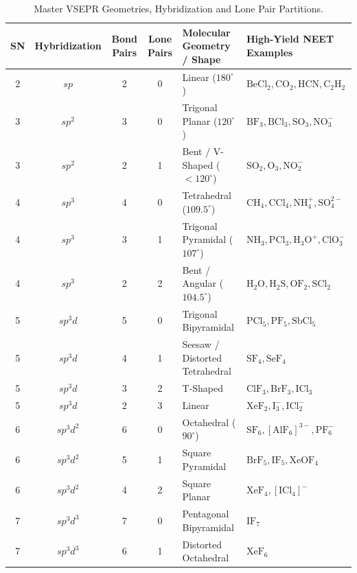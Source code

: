 \documentclass[11pt,a4paper]{article}
\begin{document}
\begin{table}[htbp]
\centering
\small
\renewcommand{\arraystretch}{1.2}
\begin{tabularx}{\textwidth}{c c c c L L}
\toprule
\textbf{SN} & \textbf{Hybridization} & \textbf{Bond Pairs} & \textbf{Lone Pairs} & \textbf{Molecular Geometry / Shape} & \textbf{High-Yield NEET Examples} \\
 & $sp$ & 2 & 0 & Linear ($180^\circ$) & $\text{BeCl}_2, \text{CO}_2, \text{HCN}, \text{C}_2\text{H}_2$ \\
3 & $sp^2$ & 3 & 0 & Trigonal Planar ($120^\circ$) & $\text{BF}_3, \text{BCl}_3, \text{SO}_3, \text{NO}_3^-$ \\
3 & $sp^2$ & 2 & 1 & Bent / V-Shaped ($< 120^\circ$) & $\text{SO}_2, \text{O}_3, \text{NO}_2^-$ \\
4 & $sp^3$ & 4 & 0 & Tetrahedral ($109.5^\circ$) & $\text{CH}_4, \text{CCl}_4, \text{NH}_4^+, \text{SO}_4^{2-}$ \\
4 & $sp^3$ & 3 & 1 & Trigonal Pyramidal ($107^\circ$) & $\text{NH}_3, \text{PCl}_3, \text{H}_3\text{O}^+, \text{ClO}_3^-$ \\
4 & $sp^3$ & 2 & 2 & Bent / Angular ($104.5^\circ$) & $\text{H}_2\text{O}, \text{H}_2\text{S}, \text{OF}_2, \text{SCl}_2$ \\
5 & $sp^3d$ & 5 & 0 & Trigonal Bipyramidal & $\text{PCl}_5, \text{PF}_5, \text{SbCl}_5$ \\
5 & $sp^3d$ & 4 & 1 & Seesaw / Distorted Tetrahedral & $\text{SF}_4, \text{SeF}_4$ \\
5 & $sp^3d$ & 3 & 2 & T-Shaped & $\text{ClF}_3, \text{BrF}_3, \text{ICl}_3$ \\
5 & $sp^3d$ & 2 & 3 & Linear & $\text{XeF}_2, \text{I}_3^-, \text{ICl}_2^-$ \\
6 & $sp^3d^2$ & 6 & 0 & Octahedral ($90^\circ$) & $\text{SF}_6, [\text{AlF}_6]^{3-}, \text{PF}_6^-$ \\
6 & $sp^3d^2$ & 5 & 1 & Square Pyramidal & $\text{BrF}_5, \text{IF}_5, \text{XeOF}_4$ \\
6 & $sp^3d^2$ & 4 & 2 & Square Planar & $\text{XeF}_4, [\text{ICl}_4]^-$ \\
7 & $sp^3d^3$ & 7 & 0 & Pentagonal Bipyramidal & $\text{IF}_7$ \\
7 & $sp^3d^3$ & 6 & 1 & Distorted Octahedral & $\text{XeF}_6$ \\
\bottomrule
\end{tabularx}
\caption{Master VSEPR Geometries, Hybridization and Lone Pair Partitions.}
\end{table}
\end{document}
